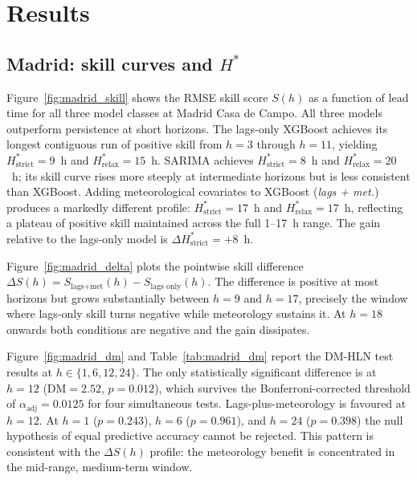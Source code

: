 \documentclass[12pt,a4paper]{article}
\begin{document}
\section{Results}
\label{sec:results}

\subsection{Madrid: skill curves and $H^*$}

Figure~\ref{fig:madrid_skill} shows the RMSE skill score $S(h)$ as a function
of lead time for all three model classes at Madrid Casa de Campo.  All three
models outperform persistence at short horizons.  The lags-only XGBoost
achieves its longest contiguous run of positive skill from $h = 3$ through $h = 11$,
yielding $H^*_{\text{strict}} = 9$~h and
$H^*_{\text{relax}} = 15$~h.  SARIMA achieves $H^*_{\text{strict}} = 8$~h
and $H^*_{\text{relax}} = 20$~h; its skill curve rises more steeply at
intermediate horizons but is less consistent than XGBoost.  Adding
meteorological covariates to XGBoost (\textit{lags + met.}) produces a
markedly different profile: $H^*_{\text{strict}} = 17$~h and
$H^*_{\text{relax}} = 17$~h, reflecting a plateau of positive skill maintained
across the full 1--17~h range.  The gain relative to the lags-only model is
$\Delta H^*_{\text{strict}} = +8$~h.

Figure~\ref{fig:madrid_delta} plots the pointwise skill difference
$\Delta S(h) = S_{\text{lags+met}}(h) - S_{\text{lags only}}(h)$.  The
difference is positive at most horizons but grows substantially between $h = 9$
and $h = 17$, precisely the window where lags-only skill turns negative while
meteorology sustains it.  At $h = 18$ onwards both conditions are negative and
the gain dissipates.

Figure~\ref{fig:madrid_dm} and Table~\ref{tab:madrid_dm} report the DM-HLN
test results at $h \in \{1, 6, 12, 24\}$.  The only statistically significant
difference is at $h = 12$ ($\mathrm{DM} = 2.52$, $p = 0.012$), which
survives the Bonferroni-corrected threshold of $\alpha_{\text{adj}} = 0.0125$
for four simultaneous tests.  Lags-plus-meteorology is favoured at $h = 12$.
At $h = 1$ ($p = 0.243$), $h = 6$ ($p = 0.961$), and $h = 24$ ($p = 0.398$)
the null hypothesis of equal predictive accuracy cannot be rejected.  This
pattern is consistent with the $\Delta S(h)$ profile: the meteorology benefit
is concentrated in the mid-range, medium-term window.
\end{document}
